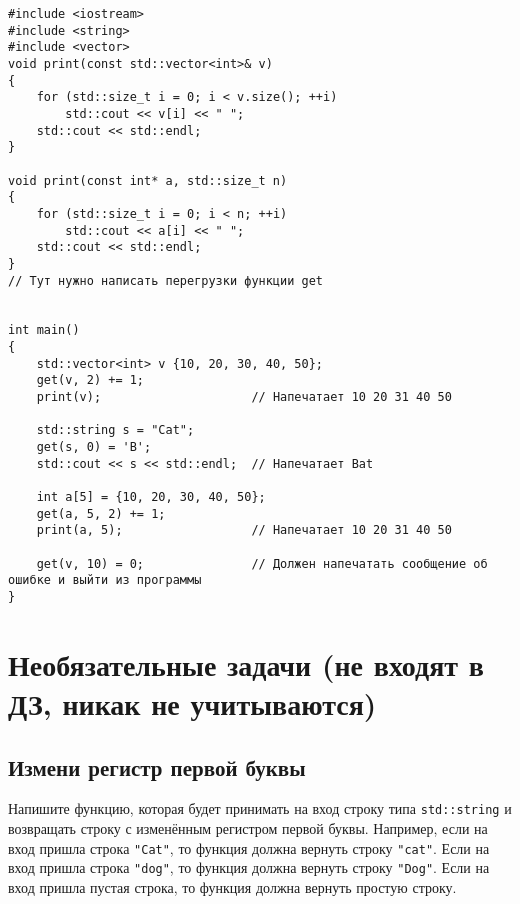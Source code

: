 \documentclass{article}
\begin{document}
\begin{lstlisting}
#include <iostream>
#include <string>
#include <vector>
void print(const std::vector<int>& v)
{
    for (std::size_t i = 0; i < v.size(); ++i)
        std::cout << v[i] << " ";
    std::cout << std::endl;
}

void print(const int* a, std::size_t n)
{
    for (std::size_t i = 0; i < n; ++i)
        std::cout << a[i] << " ";
    std::cout << std::endl;
}
// Тут нужно написать перегрузки функции get


int main()
{
    std::vector<int> v {10, 20, 30, 40, 50};
    get(v, 2) += 1;
    print(v);                     // Напечатает 10 20 31 40 50
    
    std::string s = "Cat";
    get(s, 0) = 'B';
    std::cout << s << std::endl;  // Напечатает Bat
    
    int a[5] = {10, 20, 30, 40, 50};
    get(a, 5, 2) += 1;
    print(a, 5);                  // Напечатает 10 20 31 40 50
    
    get(v, 10) = 0;               // Должен напечатать сообщение об ошибке и выйти из программы
}
\end{lstlisting} 


\newpage
\section*{Необязательные задачи (не входят в ДЗ, никак не учитываются)}
\setcounter{subsection}{0}
\subsection{Измени регистр первой буквы}
Напишите функцию, которая будет принимать на вход строку типа \texttt{std::string} и возвращать строку с изменённым регистром первой буквы. Например, если на вход пришла строка \texttt{"Cat"}, то функция должна вернуть строку \texttt{"cat"}. Если на вход пришла строка \texttt{"dog"}, то функция должна вернуть строку \texttt{"Dog"}. Если на вход пришла пустая строка, то функция должна вернуть простую строку.
\end{document}
